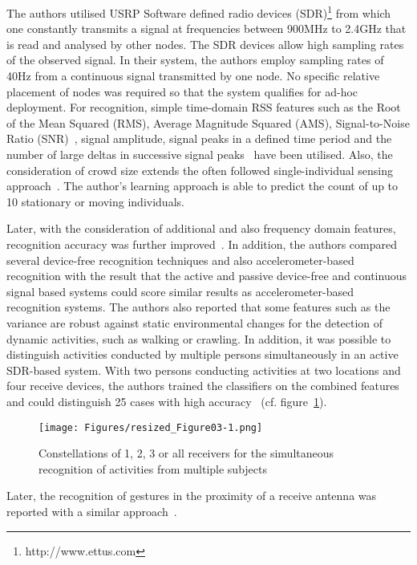 \documentclass[journal]{IEEEtran}
\begin{document}
\begin{figure*}
The authors utilised USRP Software defined radio devices (SDR)\footnote{http://www.ettus.com} from which one constantly transmits a signal at frequencies between 900MHz to 2.4GHz that is read and analysed by other nodes.
The SDR devices allow high sampling rates of the observed signal. 
In their system, the authors employ sampling rates of 40Hz from a continuous signal transmitted by one node.
No specific relative placement of nodes was required so that the system qualifies for ad-hoc deployment. 
For recognition, simple time-domain RSS features such as the Root of the Mean Squared (RMS), Average Magnitude Squared (AMS), Signal-to-Noise Ratio (SNR)~\cite{4036,ContextAwareness_Sigg_2011,OrganicComputing_Sigg_2011}, signal amplitude, signal peaks in a defined time period and the number of large deltas in successive signal peaks~\cite{Pervasive_Scholz_2011} have been utilised.
Also, the consideration of crowd size extends the often followed single-individual sensing approach~\cite{RFsensing_Xu_2013}.
The author's learning approach is able to predict the count of up to 10 stationary or moving individuals.

Later, with the consideration of additional and also frequency domain features, recognition accuracy was further improved~\cite{Pervasive_Sigg_2012, Pervasive_Sigg_2013}.
In addition, the authors compared several device-free recognition techniques and also accelerometer-based recognition with the result that the active and passive device-free and continuous signal based systems could score similar results as accelerometer-based recognition systems.
The authors also reported that some features such as the variance are robust against static environmental changes for the detection of dynamic activities, such as walking or crawling.
In addition, it was possible to distinguish activities conducted by multiple persons simultaneously in an active SDR-based system.
With two persons conducting activities at two locations and four receive devices, the authors trained the classifiers on the combined features and could distinguish 25 cases with high accuracy~\cite{DeviceFreeRecognition_Sigg_2013} (cf. figure~\ref{figureEnvironment}).
\begin{figure}
     \begin{center}
     \texttt{[image: Figures/resized\_Figure03-1.png]}
     \caption{Constellations of 1, 2, 3 or all receivers for the simultaneous recognition of activities from multiple subjects~\cite{DeviceFreeRecognition_Sigg_2013}}
     \label{figureEnvironment}
          \end{center}
\end{figure}
Later, the recognition of gestures in the proximity of a receive antenna was reported with a similar approach~\cite{Pervasive_Sigg_2014b}. 


\end{figure*}
\end{document}
